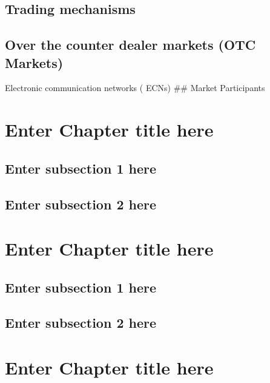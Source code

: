 \documentclass[
]{book}
\begin{document}
\hypertarget{trading-mechanisms}{%
\section{Trading mechanisms}\label{trading-mechanisms}}

\hypertarget{over-the-counter-dealer-markets-otc-markets}{%
\section{Over the counter dealer markets (OTC Markets)}\label{over-the-counter-dealer-markets-otc-markets}}

Electronic communication networks ( ECNs)
\#\# Market Participants

\hypertarget{ch2}{%
\chapter{Enter Chapter title here}\label{ch2}}

\hypertarget{enter-subsection-1-here}{%
\section{Enter subsection 1 here}\label{enter-subsection-1-here}}

\hypertarget{enter-subsection-2-here}{%
\section{Enter subsection 2 here}\label{enter-subsection-2-here}}

\hypertarget{ch3}{%
\chapter{Enter Chapter title here}\label{ch3}}

\hypertarget{enter-subsection-1-here-1}{%
\section{Enter subsection 1 here}\label{enter-subsection-1-here-1}}

\hypertarget{enter-subsection-2-here-1}{%
\section{Enter subsection 2 here}\label{enter-subsection-2-here-1}}

\hypertarget{ch4}{%
\chapter{Enter Chapter title here}\label{ch4}}
\end{document}
